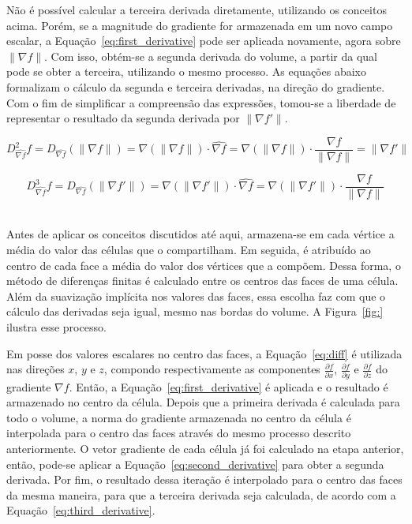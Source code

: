 	Não é possível calcular a terceira derivada diretamente, utilizando os conceitos acima. Porém, se a magnitude do gradiente for armazenada em um novo campo escalar, a Equação~\eqref{eq:first_derivative} pode ser aplicada novamente, agora sobre $ \|\nabla f\| $. Com isso, obtém-se a segunda derivada do volume, a partir da qual pode se obter a terceira, utilizando o mesmo processo. As equações abaixo formalizam o cálculo da segunda e terceira derivadas, na direção do gradiente. Com o fim de simplificar a compreensão das expressões, tomou-se a liberdade de representar o resultado da segunda derivada por $ \|\nabla f'\| $.
	
\begin{equation}\label{eq:second_derivative}
	D^{2}_{\widehat{\nabla f}} f = D_{\widehat{\nabla f}} (\|\nabla f\|) = \nabla (\|\nabla f\|) \cdot \widehat{\nabla f} = \nabla (\|\nabla f\|) \cdot \frac{\nabla f}{\|\nabla f\|} = \|\nabla f'\|
\end{equation}

\begin{equation}\label{eq:third_derivative}
	D^{3}_{\widehat{\nabla f}} f = D_{\widehat{\nabla f}} (\|\nabla f'\|) = \nabla (\|\nabla f'\|) \cdot \widehat{\nabla f} = \nabla (\|\nabla f'\|) \cdot \frac{\nabla f}{\|\nabla f\|}
\end{equation} \

	Antes de aplicar os conceitos discutidos até aqui, armazena-se em cada vértice a média do valor das células que o compartilham. Em seguida, é atribuído ao centro de cada face a média do valor dos vértices que a compõem. Dessa forma, o método de diferenças finitas é calculado entre os centros das faces de uma célula. Além da suavização implícita nos valores das faces, essa escolha faz com que o cálculo das derivadas seja igual, mesmo nas bordas do volume. A Figura~\ref{fig:} ilustra esse processo.
	
	Em posse dos valores escalares no centro das faces, a Equação~\eqref{eq:diff} é utilizada nas direções $ x $, $ y $ e $ z $, compondo respectivamente as componentes $ \frac{\partial f}{\partial x} $, $ \frac{\partial f}{\partial y} $ e $ \frac{\partial f}{\partial z} $ do gradiente $ \nabla f $. Então, a Equação~\eqref{eq:first_derivative} é aplicada e o resultado é armazenado no centro da célula. Depois que a primeira derivada é calculada para todo o volume, a norma do gradiente armazenada no centro da célula é interpolada para o centro das faces através do mesmo processo descrito anteriormente. O vetor gradiente de cada célula já foi calculado na etapa anterior, então, pode-se aplicar a Equação~\eqref{eq:second_derivative} para obter a segunda derivada. Por fim, o resultado dessa iteração é interpolado para o centro das faces da mesma maneira, para que a terceira derivada seja calculada, de acordo com a Equação~\eqref{eq:third_derivative}.

